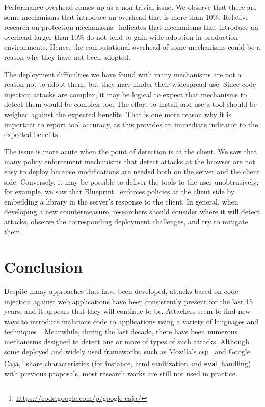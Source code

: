 \documentclass[10pt,journal,compsoc]{IEEEtran}
\begin{document}
Performance overhead comes up as a non-trivial issue. We observe
that there are some mechanisms that introduce an overhead
that is more than 10\%. Relative
research on protection mechanisms~\cite{SPWS13} indicates that
mechanisms that introduce an overhead larger than 10\% do not tend to
gain wide adoption in production environments. Hence, the
computational overhead of some mechanisms could be a reason why they
have not been adopted.

The deployment difficulties we have found with many mechanisms are not
a reason not to adopt them, but they may hinder their widespread use.
Since code injection attacks are complex, it may be logical to
expect that mechanisms to detect them would be complex too. The effort
to install and use a tool should be weighed against the expected
benefits. That is one more reason why it is important to report tool
accuracy, as this provides an immediate indicator to the expected
benefits. 

The issue is more acute when the point of detection is at the client.
We saw that many policy enforcement mechanisms that detect attacks at
the browser are not easy to deploy because modifications are needed
both on the server and the client side.
Conversely, it may be possible to deliver
the tools to the user unobtrusively; for example, we saw that
Blueprint~\cite{LV09} enforces policies at the client side by embedding a library
in the server's response to the client. In general, when developing a
new countermeasure, researchers should consider where it
will detect attacks, observe the corresponding deployment
challenges, and try to mitigate them.

\section{Conclusion}
\label{sec:conclusion}

Despite many approaches that have been developed,
attacks based on code injection against web applications
have been consistently present for the last 15 years,
and it appears that they will continue to be.
Attackers seem to find new ways to introduce
malicious code to applications using a
variety of languages and techniques~\cite{HNSHS12,DKH14}.
Meanwhile, during the last decade, there have been
numerous mechanisms designed to
detect one or more of types of such attacks.
Although some deployed and widely used frameworks, 
such as Mozilla's {\sc csp}~\cite{SSM10} and
Google Caja,\footnote{\url{https://code.google.com/p/google-caja/}}%
share characteristics
(for instance, {\sc html} sanitization and {\tt eval} handling)
with previous proposals, 
most research works are still not used in practice.
\end{document}
